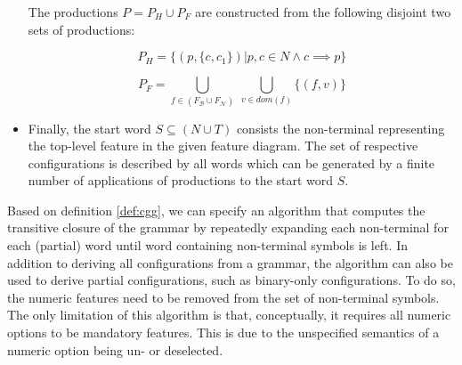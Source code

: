 \begin{definition}
\begin{itemize}
  The productions $P = P_H \cup P_F$ are constructed from the following disjoint
  two sets of productions:
  
  \begin{equation}
  P_H = \lbrace (p, \lbrace c, c_1 \rbrace) | p, c \in N \land
  c \implies p\rbrace
  \end{equation}
  
  \begin{equation}
  P_F = \bigcup_{f \in (F_\mathcal{B} \cup F_\mathcal{N})} ~ \bigcup_{v \in
  dom(f)} \lbrace (f, v) \rbrace
  \end{equation}
	
  \item Finally, the start word $S \subseteq (N \cup T)$ consists the
  non-terminal representing the top-level feature in the given feature diagram.
  The set of respective configurations is described by all words which can be
  generated by a finite number of applications of productions to the start word
  $S$.
  
  \end{itemize}
\end{definition}

Based on definition \ref{def:cgg}, we can specify an algorithm that computes the
transitive closure of the grammar by repeatedly expanding each non-terminal for
each (partial) word until word containing non-terminal symbols is left.
In addition to deriving all configurations from a grammar, the
algorithm can also be used to derive partial configurations, such as
binary-only configurations. To do so, the numeric features need to be removed
from the set of non-terminal symbols. The only limitation of this algorithm is
that, conceptually, it requires all numeric options to be mandatory features.
This is due to the unspecified semantics of a numeric option being un- or
deselected.

 
